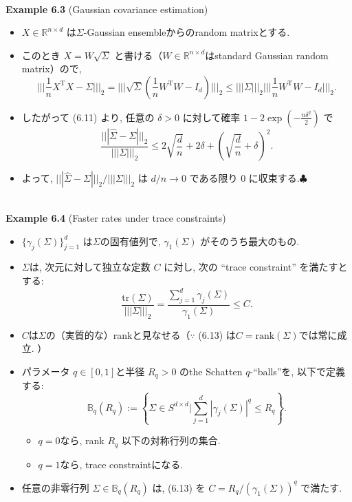 \documentclass[unicode,aspectratio=169,11pt]{beamer}
\def\endexample{\hfill $\clubsuit$}
\newcommand{\bb}{\mathbb}
\newcommand{\tr}{\mathrm{T}}
\newcommand{\trace}{\mathrm{tr}}
\begin{document}
\begin{frame}{}{}
　\\
{\bf Example 6.3} (Gaussian covariance estimation)
\begin{itemize}
  \item $X \in \bb{R}^{n \times d}$ は$\Sigma$-Gaussian ensembleからのrandom matrixとする.
  \item このとき $X = W \sqrt{\Sigma}$ と書ける（$W \in \bb{R}^{n\times d}$はstandard Gaussian random matrix）ので,
          \[
              \Bigg|\Bigg|\Bigg| \frac{1}{n} X^\tr X - \Sigma \Bigg|\Bigg|\Bigg|_2
              = \Bigg|\Bigg|\Bigg|\sqrt{\Sigma}\left(\frac{1}{n}W^\tr W - I_d\right) \Bigg|\Bigg|\Bigg|_2
              \le |||\Sigma|||_2 \Bigg|\Bigg|\Bigg| \frac{1}{n} W^\tr W - I_d \Bigg|\Bigg|\Bigg|_2.
          \]
  \item したがって (6.11) より, 任意の $\delta > 0$ に対して確率 $1 - 2\exp\left(-\frac{n \delta^2}{2}\right)$ で
          \[
            \frac{||| \widehat{\Sigma} - \Sigma |||_2}{|||\Sigma|||_2}
            \le 2 \sqrt{\frac{d}{n}} + 2\delta + \left(\sqrt{\frac{d}{n}} + \delta\right)^2.
            \tag{6.12} 
          \]
  \item よって, $||| \widehat{\Sigma} - \Sigma |||_2 / |||\Sigma|||_2$ は $d/n \to 0$ である限り $0$ に収束する.\endexample
\end{itemize}
\end{frame}

\begin{frame}{}{}
　\\
{\bf Example 6.4} (Faster rates under trace constraints)
\begin{itemize}
  \item $\{ \gamma_j(\Sigma)\}_{j = 1}^d$ は$\Sigma$の固有値列で, $\gamma_1(\Sigma)$ がそのうち最大のもの.
  \item $\Sigma$は, 次元に対して独立な定数 $C$ に対し, 次の ``trace constraint'' を満たすとする:
        \[
            \frac{\trace(\Sigma)}{|||\Sigma|||_2}
            = \frac{\sum_{j=1}^d \gamma_j(\Sigma)}{\gamma_1(\Sigma)}
            \le C.
            \tag{6.13}
        \]
  \item $C$は$\Sigma$の（実質的な）rankと見なせる（$\because$ (6.13) は$C = \mathrm{rank}(\Sigma)$では常に成立. ）
  \item パラメータ $q \in [0,1]$と半径 $R_q >0$ のthe Schatten $q$-``balls''を, 以下で定義する:
        \[
          \bb{B}_q(R_q)
          := \left\{ \Sigma\in S^{d \times d} \Bigg| \sum_{j=1}^d|\gamma_j(\Sigma)|^q \le R_q \right\}.
          \tag{6.14}
        \]
        \begin{itemize}
          \item $q = 0$なら, rank $R_q$ 以下の対称行列の集合.
          \item $q = 1$なら, trace constraintになる.
        \end{itemize}
  \item 任意の非零行列 $\Sigma \in \bb{B}_q(R_q)$ は, (6.13) を $C = R_q / (\gamma_1(\Sigma))^q$ で満たす.
\end{itemize}
\end{frame}
\end{document}
